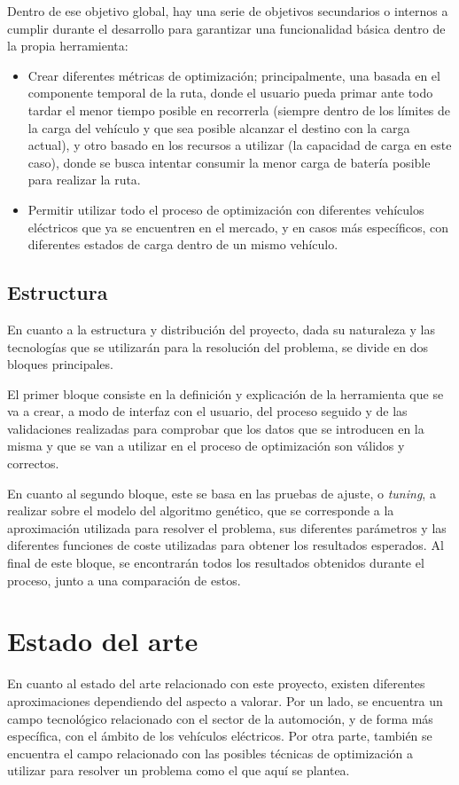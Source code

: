 \documentclass[11pt,spanish,listoffigures,listoftables]{tfgetsinf}
\begin{document}
Dentro de ese objetivo global, hay una serie de objetivos secundarios o internos a cumplir durante el desarrollo para garantizar una funcionalidad básica dentro de la propia herramienta:
\begin{itemize}
    \item Crear diferentes métricas de optimización; principalmente, una basada en el componente temporal de la ruta, donde el usuario pueda primar ante todo tardar el menor tiempo posible en recorrerla (siempre dentro de los límites de la carga del vehículo y que sea posible alcanzar el destino con la carga actual), y otro basado en los recursos a utilizar (la capacidad de carga en este caso), donde se busca intentar consumir la menor carga de batería posible para realizar la ruta.
    \item Permitir utilizar todo el proceso de optimización con diferentes vehículos eléctricos que ya se encuentren en el mercado, y en casos más específicos, con diferentes estados de carga dentro de un mismo vehículo.
\end{itemize}
 
\section{Estructura}
En cuanto a la estructura y distribución del proyecto, dada su naturaleza y las tecnologías que se utilizarán para la resolución del problema, se divide en dos bloques principales.

El primer bloque consiste en la definición y explicación de la herramienta que se va a crear, a modo de interfaz con el usuario, del proceso seguido y de las validaciones realizadas para comprobar que los datos que se introducen en la misma y que se van a utilizar en el proceso de optimización son válidos y correctos.

En cuanto al segundo bloque, este se basa en las pruebas de ajuste, o \textit{tuning}, a realizar sobre el modelo del algoritmo genético, que se corresponde a la aproximación utilizada para resolver el problema, sus diferentes parámetros y las diferentes funciones de coste utilizadas para obtener los resultados esperados. Al final de este bloque, se encontrarán todos los resultados obtenidos durante el proceso, junto a una comparación de estos.

\chapter{Estado del arte}
En cuanto al estado del arte relacionado con este proyecto, existen diferentes aproximaciones dependiendo del aspecto a valorar. Por un lado, se encuentra un campo tecnológico relacionado con el sector de la automoción, y de forma más específica, con el ámbito de los vehículos eléctricos. Por otra parte, también se encuentra el campo relacionado con las posibles técnicas de optimización a utilizar para resolver un problema como el que aquí se plantea. %
\end{document}
